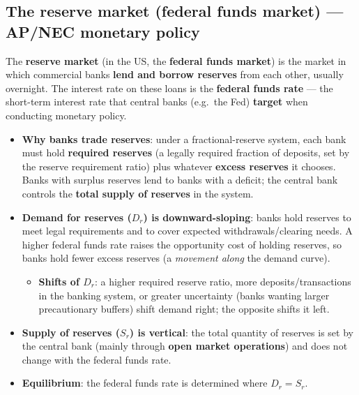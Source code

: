 \documentclass[a4paper,12pt]{article}
\newcommand{\needbold}[1]{\textcolor{red!70!black}{\textbf{#1}}}
\begin{document}
\subsection*{The reserve market (federal funds market) --- AP/NEC monetary policy}\label{sec:add-reserve-market}
The \needbold{reserve market} (in the US, the \needbold{federal funds market}) is the market in which commercial banks \textbf{lend and borrow reserves} from each other, usually overnight. The interest rate on these loans is the \needbold{federal funds rate} --- the short-term interest rate that central banks (e.g.\ the Fed) \textbf{target} when conducting monetary policy.
\begin{itemize}
  \item \textbf{Why banks trade reserves}: under a fractional-reserve system, each bank must hold \textbf{required reserves} (a legally required fraction of deposits, set by the reserve requirement ratio) plus whatever \textbf{excess reserves} it chooses. Banks with surplus reserves lend to banks with a deficit; the central bank controls the \textbf{total supply of reserves} in the system.
  \item \textbf{Demand for reserves ($D_r$) is downward-sloping}: banks hold reserves to meet legal requirements and to cover expected withdrawals/clearing needs. A higher federal funds rate raises the opportunity cost of holding reserves, so banks hold fewer excess reserves (a \textit{movement along} the demand curve).
  \begin{itemize}
    \item \textbf{Shifts of $D_r$}: a higher required reserve ratio, more deposits/transactions in the banking system, or greater uncertainty (banks wanting larger precautionary buffers) shift demand right; the opposite shifts it left.
  \end{itemize}
  \item \textbf{Supply of reserves ($S_r$) is vertical}: the total quantity of reserves is set by the central bank (mainly through \textbf{open market operations}) and does not change with the federal funds rate.
  \item \textbf{Equilibrium}: the federal funds rate is determined where $D_r = S_r$.
\end{itemize}
\end{document}
